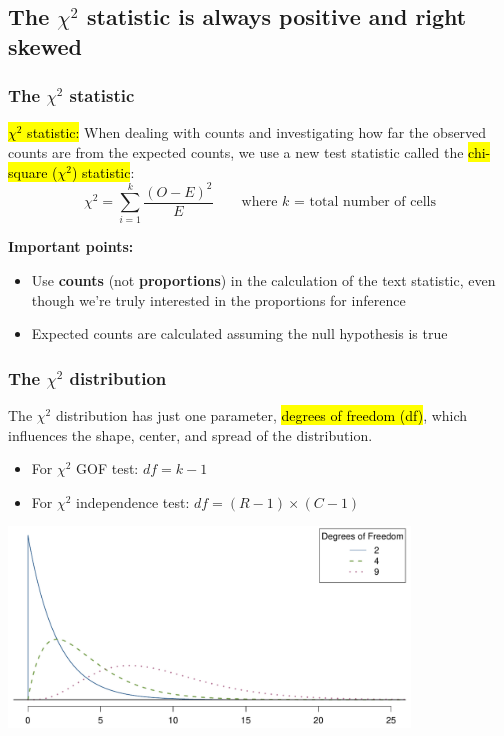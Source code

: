 \documentclass[slidestop,compress,mathserif,12pt,t,professionalfonts,xcolor=table]{beamer}
\begin{document}

\subsection{The $\chi^2$ statistic is always positive and right skewed}
\label{mi2}


\begin{frame}
\frametitle{The $\chi^2$ statistic}

\hl{$\chi^2$ statistic:} When dealing with counts and investigating how far the observed counts are from the expected counts, we use a new test statistic called the \hl{chi-square ($\chi^2$) statistic}:
\[\chi^2 = \sum_{i = 1}^k \frac{(O - E)^2}{E} \qquad \text{where $k$ = total number of cells} \]

\textbf{Important points:}
\begin{itemize}
\item Use \textbf{counts} (not \textbf{proportions}) in the calculation of the text statistic, even though we're truly interested in the proportions for inference
\item Expected counts are calculated assuming the null hypothesis is true
\end{itemize}

\end{frame}


\begin{frame}
\frametitle{The $\chi^2$ distribution}

The $\chi^2$ distribution has just one parameter, \hl{degrees of freedom (df)}, which influences the shape, center, and spread of the distribution.
\begin{itemize}
\item For $\chi^2$ GOF test: $df = k - 1$ \\
\item For $\chi^2$ independence test: $df = (R-1) \times (C-1)$ 
\end{itemize}

\pause

\begin{center}
\includegraphics[width=0.8\textwidth]{figures/chiSquareDistributionWithInceasingDF/chiSquareDistributionWithInceasingDF}
\end{center}

\end{frame}
\end{document}
